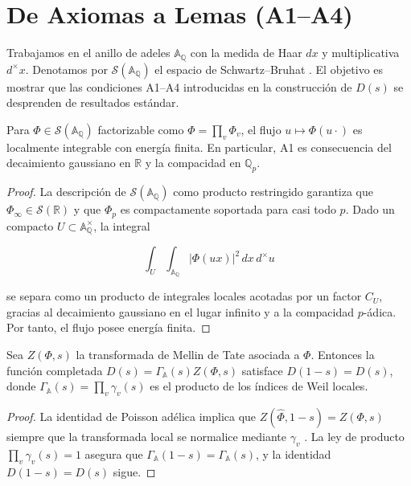 \section{De Axiomas a Lemas (A1--A4)}

Trabajamos en el anillo de adeles $\mathbb{A}_\mathbb{Q}$ con la medida de Haar
$dx$ y multiplicativa $d^{\times}x$.  Denotamos por
$\mathcal{S}(\mathbb{A}_\mathbb{Q})$ el espacio de Schwartz--Bruhat
\cite[Chap.~I]{Tate1967}.  El objetivo es mostrar que las condiciones A1--A4
introducidas en la construcción de $D(s)$ se desprenden de resultados estándar.

\begin{lemma}\label{lem:A1-paper}
Para $\Phi\in\mathcal{S}(\mathbb{A}_\mathbb{Q})$ factorizable como
$\Phi=\prod_v \Phi_v$, el flujo $u\mapsto\Phi(u\cdot)$ es localmente integrable con
energía finita.  En particular, A1 es consecuencia del decaimiento gaussiano en
$\mathbb{R}$ y la compacidad en $\mathbb{Q}_p$.
\end{lemma}

\begin{proof}
La descripción de $\mathcal{S}(\mathbb{A}_\mathbb{Q})$ como producto restringido
\cite[Prop.~2]{Tate1967} garantiza que $\Phi_\infty\in\mathcal{S}(\mathbb{R})$ y que
$\Phi_p$ es compactamente soportada para casi todo $p$.  Dado un compacto
$U\subset\mathbb{A}_\mathbb{Q}^{\times}$, la integral

\[
  \int_U\!\int_{\mathbb{A}_\mathbb{Q}} |\Phi(u x)|^2\,dx\,d^{\times}u
\]

se separa como un producto de integrales locales acotadas por un factor
$C_U$, gracias al decaimiento gaussiano en el lugar infinito y a la compacidad
$p$-ádica.  Por tanto, el flujo posee energía finita.
\end{proof}

\begin{lemma}\label{lem:A2-paper}
Sea $Z(\Phi,s)$ la transformada de Mellin de Tate asociada a $\Phi$.  Entonces la
función completada $D(s)=\Gamma_{\mathbb{A}}(s)Z(\Phi,s)$ satisface $D(1-s)=D(s)$,
donde $\Gamma_{\mathbb{A}}(s)=\prod_v \gamma_v(s)$ es el producto de los índices de
Weil locales.
\end{lemma}

\begin{proof}
La identidad de Poisson adélica
\cite[Thm.~2]{Tate1967}
implica que $Z(\widehat{\Phi},1-s)=Z(\Phi,s)$ siempre que la transformada local se
normalice mediante $\gamma_v$ \cite[§II.3]{Weil1964}.  La ley de producto
$\prod_v\gamma_v(s)=1$ asegura que $\Gamma_{\mathbb{A}}(1-s)=\Gamma_{\mathbb{A}}(s)$, y la
identidad $D(1-s)=D(s)$ sigue.
\end{proof}

